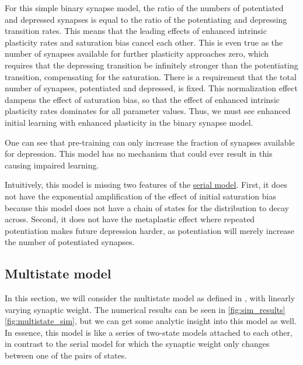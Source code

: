 \documentclass[10pt]{article}
\begin{document}
For this simple binary synapse model, the ratio of the numbers of potentiated and depressed synapses is equal to the ratio of the potentiating and depressing transition rates.
This means that the leading effects of enhanced intrinsic plasticity rates and saturation bias cancel each other.
This is even true as the number of synapses available for further plasticity approaches zero, which requires that the depressing transition be infinitely stronger than the potentiating transition, compensating for the saturation.
There is a requirement that the total number of synapses, potentiated and depressed, is fixed.
This normalization effect dampens the effect of saturation bias, so that the effect of enhanced intrinsic plasticity rates dominates for all parameter values.
Thus, we must see enhanced initial learning with enhanced plasticity in the binary synapse model.

One can see that pre-training can only increase the fraction of synapses available for depression.
This model has no mechanism that could ever result in this causing impaired learning.

Intuitively, this model is missing two features of the \hyperref[sec:multistate]{serial model}.
First, it does not have the exponential amplification of the effect of initial saturation bias because this model does not have a chain of states for the distribution to decay across.
Second, it does not have the metaplastic effect where repeated potentiation makes future depression harder, as potentiation will merely increase the number of potentiated synapses.




\subsection{Multistate model}\label{sec:multistate_lin}



In this section, we will consider the multistate model as defined in \cite{amit1994learning}, \ie with linearly varying synaptic weight.
The numerical results can be seen in
\autoref{fig:sim_results}\ref{fig:multistate_sim}, %
but we can get some analytic insight into this model as well.
In essence, this model is like a series of two-state models attached to each other, in contrast to the serial model for which the synaptic weight only changes between one of the pairs of states.
\end{document}
